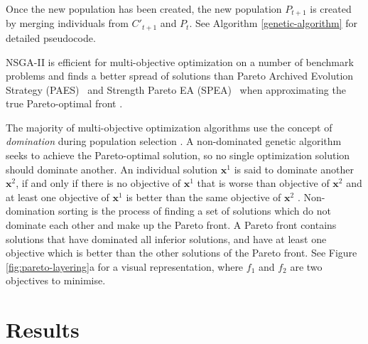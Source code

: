 \documentclass[12pt,doublespacing,a4paper]{ouparticle}
\begin{document}
Once the new population has been created, the new population $P_{t+1}$ is created by merging individuals from $C'_{t+1}$ and $P_{t}$. See Algorithm \ref{genetic-algorithm} for detailed pseudocode.


NSGA-II is efficient for multi-objective optimization on a number of benchmark problems and finds a better spread of solutions than Pareto Archived Evolution Strategy (PAES)~\cite{Knowles1999} and Strength Pareto EA (SPEA)~\cite{Zitzler2006} when approximating the true Pareto-optimal front \cite{Valkanas2014}.

The majority of multi-objective optimization algorithms use the concept of \emph{domination} during population selection \cite{Burke2014}. A non-dominated genetic algorithm seeks to achieve the Pareto-optimal solution, so no single optimization solution should dominate another. An individual solution $\mathbf{x}^{1}$ is said to dominate another $\mathbf{x}^{2}$, if and only if there is no objective of $\mathbf{x}^{1}$ that is worse than objective of $\mathbf{x}^{2}$ and at least one objective of $\mathbf{x}^{1}$ is better than the same objective of $\mathbf{x}^{2}$ \cite{Bao2017}. Non-domination sorting is the process of finding a set of solutions which do not dominate each other and make up the Pareto front. A Pareto front contains solutions that have dominated all inferior solutions, and have at least one objective which is better than the other solutions of the Pareto front. See Figure \ref{fig:pareto-layering}a for a visual representation, where $f_1$ and $f_2$ are two objectives to minimise.


\section{Results}
\end{document}
